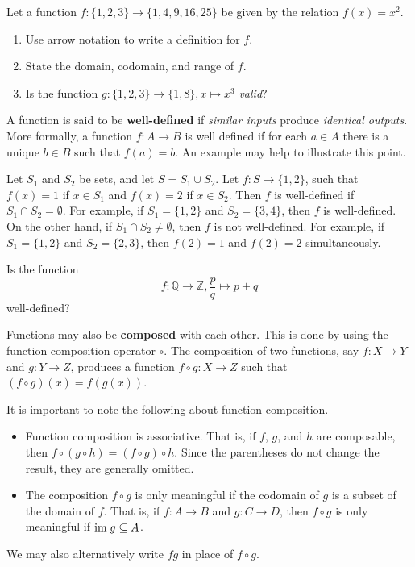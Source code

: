 \newpage

\begin{exercise}
    Let a function $f: \{1, 2, 3\} \to \{1, 4, 9, 16, 25\}$ be given by the relation $f(x) = x^2$.
    \begin{enumerate}[label=(\roman*)]
        \item Use arrow notation to write a definition for $f$.
        \item State the domain, codomain, and range of $f$.
        \item Is the function $g: \{1, 2, 3\} \to \{1, 8\}, x \mapsto x^3$ \textit{valid}?
    \end{enumerate}
\end{exercise}

A function is said to be \textbf{well-defined} if \textit{similar inputs} produce \textit{identical outputs}. More formally, a function $f: A \to B$ is well defined if for each $a \in A$ there is a unique $b \in B$ such that $f(a) = b$. An example may help to illustrate this point.
\begin{example}
    Let $S_1$ and $S_2$ be sets, and let $S = S_1 \cup S_2$. Let $f: S \to \{1, 2\}$, such that $f(x) = 1$ if $x \in S_1$ and $f(x) = 2$ if $x \in S_2$. Then $f$ is well-defined if $S_1 \cap S_2 = \emptyset$. For example, if $S_1 = \{1, 2\}$ and $S_2 = \{3, 4\}$, then $f$ is well-defined. On the other hand, if $S_1 \cap S_2 \neq \emptyset$, then $f$ is not well-defined. For example, if $S_1 = \{1, 2\}$ and $S_2 = \{2, 3\}$, then $f(2) = 1$ and $f(2) = 2$ simultaneously.
\end{example}
\begin{exercise}
    Is the function
    \[
        f: \mathbb{Q} \to \mathbb{Z}, \frac pq \mapsto p + q    
    \]
    well-defined?
\end{exercise}

Functions may also be \textbf{composed} with each other. This is done by using the function composition operator $\circ$. The composition of two functions, say $f: X \to Y$ and $g: Y \to Z$, produces a function $f \circ g: X \to Z$ such that $(f \circ g)(x) = f(g(x))$.

It is important to note the following about function composition.
\begin{itemize}
    \item Function composition is associative. That is, if $f$, $g$, and $h$ are composable, then $f \circ (g \circ h) = (f \circ g) \circ h$. Since the parentheses do not change the result, they are generally omitted.
    \item The composition $f \circ g$ is only meaningful if the codomain of $g$ is a subset of the domain of $f$. That is, if $f: A \to B$ and $g: C \to D$, then $f \circ g$ is only meaningful if $\mathrm{im}\; g \subseteq A$.
\end{itemize}
We may also alternatively write $fg$ in place of $f \circ g$.

